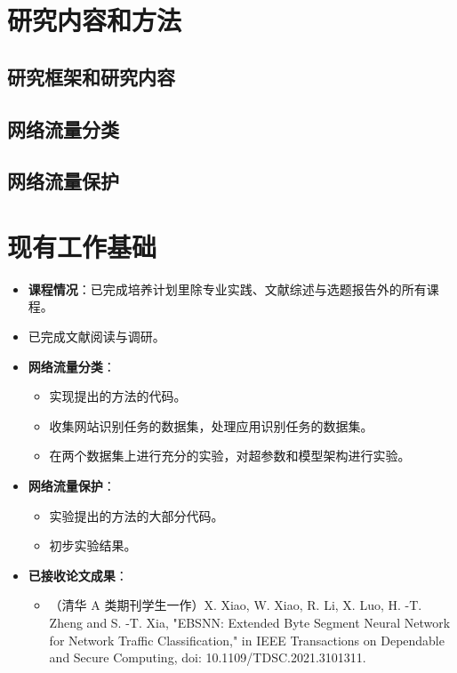 \documentclass[degree=master,cjk-font=noto]{thuthesis}
\begin{document}
\chapter{研究内容和方法}

\section{研究框架和研究内容}

\section{网络流量分类}

\section{网络流量保护}

\chapter{现有工作基础}

\begin{itemize}
	\item \textbf{课程情况}：已完成培养计划里除专业实践、文献综述与选题报告外的所有课程。
	\item 已完成文献阅读与调研。
	\item \textbf{网络流量分类}：
	\begin{itemize}
		\item 实现提出的方法的代码。
		\item 收集网站识别任务的数据集，处理应用识别任务的数据集。
		\item 在两个数据集上进行充分的实验，对超参数和模型架构进行实验。
	\end{itemize}
	\item \textbf{网络流量保护}：
	\begin{itemize}
		\item 实验提出的方法的大部分代码。
		\item 初步实验结果。
	\end{itemize}
	\item \textbf{已接收论文成果}：
	\begin{itemize}
		\item （清华 A 类期刊学生一作）X. Xiao, W. Xiao, R. Li, X. Luo, H. -T. Zheng and S. -T. Xia, "EBSNN: Extended Byte Segment Neural Network for Network Traffic Classification," in IEEE Transactions on Dependable and Secure Computing, doi: 10.1109/TDSC.2021.3101311.
	\end{itemize}
\end{itemize}
\end{document}
